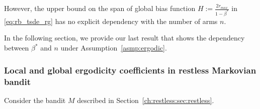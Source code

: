 However, the upper bound on the span of global bias function $H:=\displaystyle\frac{2r_{max}}{1-\beta^*}$ in \eqref{eq:rb_tsde_rg} has no explicit dependency with the number of arms $n$.

In the following section, we provide our last result that shows the dependency between $\beta^*$ and $n$ under Assumption~\ref{asmp:ergodic}.

\subsubsection{Local and global ergodicity coefficients in restless Markovian bandit}

Consider the bandit $M$ described in Section~\ref{ch:restless:sec:restless}.

